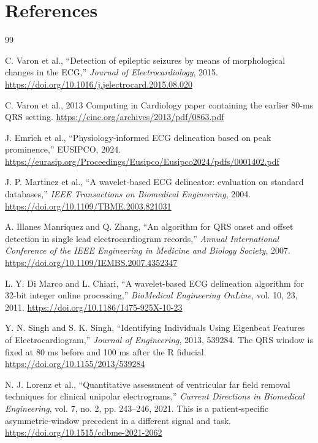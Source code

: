 \documentclass[11pt,a4paper]{article}
\begin{document}
\section{References}

\begin{thebibliography}{99}

C. Varon et al., ``Detection of epileptic seizures by means of morphological changes in the ECG,'' \emph{Journal of Electrocardiology}, 2015. \url{https://doi.org/10.1016/j.jelectrocard.2015.08.020}

C. Varon et al., 2013 Computing in Cardiology paper containing the earlier 80-ms QRS setting. \url{https://cinc.org/archives/2013/pdf/0863.pdf}

J. Emrich et al., ``Physiology-informed ECG delineation based on peak prominence,'' EUSIPCO, 2024. \url{https://eurasip.org/Proceedings/Eusipco/Eusipco2024/pdfs/0001402.pdf}

J. P. Martinez et al., ``A wavelet-based ECG delineator: evaluation on standard databases,'' \emph{IEEE Transactions on Biomedical Engineering}, 2004. \url{https://doi.org/10.1109/TBME.2003.821031}

A. Illanes Manriquez and Q. Zhang, ``An algorithm for QRS onset and offset detection in single lead electrocardiogram records,'' \emph{Annual International Conference of the IEEE Engineering in Medicine and Biology Society}, 2007. \url{https://doi.org/10.1109/IEMBS.2007.4352347}

L. Y. Di Marco and L. Chiari, ``A wavelet-based ECG delineation algorithm for 32-bit integer online processing,'' \emph{BioMedical Engineering OnLine}, vol. 10, 23, 2011. \url{https://doi.org/10.1186/1475-925X-10-23}

Y. N. Singh and S. K. Singh, ``Identifying Individuals Using Eigenbeat Features of Electrocardiogram,'' \emph{Journal of Engineering}, 2013, 539284. The QRS window is fixed at 80 ms before and 100 ms after the R fiducial. \url{https://doi.org/10.1155/2013/539284}

N. J. Lorenz et al., ``Quantitative assessment of ventricular far field removal techniques for clinical unipolar electrograms,'' \emph{Current Directions in Biomedical Engineering}, vol. 7, no. 2, pp. 243--246, 2021. This is a patient-specific asymmetric-window precedent in a different signal and task. \url{https://doi.org/10.1515/cdbme-2021-2062}


\end{thebibliography}
\end{document}
